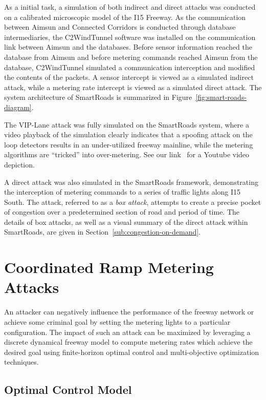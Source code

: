 As a initial task, a simulation of both indirect and direct attacks was conducted on a calibrated microscopic model of the I15 Freeway. As the communication between Aimsun and Connected Corridors is conducted through database intermediaries, the C2WindTunnel software was installed on the communication link between Aimsun and the databases. Before sensor information reached the database from Aimsun and before metering commands reached Aimsun from the database, C2WindTunnel simulated a communication interception and modified the contents of the packets. A sensor intercept is viewed as a simulated indirect attack, while a metering rate intercept is viewed as a simulated direct attack. The system architecture of SmartRoads is summarized in Figure~\ref{fig:smart-roads-diagram}.

The VIP-Lane attack was fully simulated on the SmartRoads system, where a video playback of the simulation clearly indicates that a spoofing attack on the loop detectors results in an under-utilized freeway mainline, while the metering algorithms are ``tricked'' into over-metering.  See our link~\cite{smartroadswebsite} for a Youtube video depiction.

A direct attack was also simulated in the SmartRoads framework, demonstrating the interception of metering commands to a series of traffic lights along I15 South. The attack, referred to as a \emph{box attack}, attempts to create a precise pocket of congestion over a predetermined section of road and period of time. The details of box attacks, as well as a visual summary of the direct attack within SmartRoads, are given in Section~\ref{sub:congestion-on-demand}.


\section{Coordinated Ramp Metering Attacks}
\label{sec:problemformulation}

An attacker can negatively influence the performance of the freeway network or achieve some criminal goal by setting the metering lights to a particular configuration. The impact of such an attack can be maximized by leveraging a discrete dynamical freeway model to compute metering rates which achieve the desired goal using finite-horizon optimal control and multi-objective optimization techniques.

\subsection{Optimal Control Model}
\label{sub:fhoc-adjoint}

